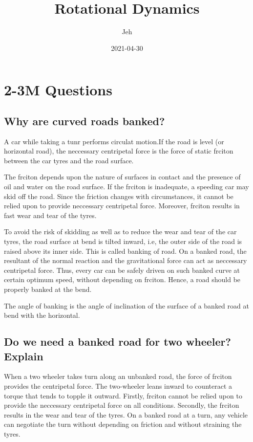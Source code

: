 \documentclass{article}
\title{Rotational Dynamics}
\date{2021-04-30}
\author{Jeh}
\begin{document}
\maketitle
{}
   \section{2-3M Questions}
   \subsection{Why are curved roads banked?}
   A car while taking a tunr performs circulat motion.If the 
   road is level (or horizontal road), the neccessary 
   centripetal force is the force of static frciton between the
   car tyres and the road surface.

   The frciton depends upon the nature of surfaces in contact
   and the presence of oil and water on the road surface. If 
   the frciton is inadequate, a speeding car may skid off the
   road. Since the friction changes with circumstances, it 
   cannot be relied upon to provide neccessary centripetal force.
   Moreover, frciton results in fast wear and tear of the tyres.

   To avoid the risk of skidding as well as to reduce the wear
   and tear of the car tyres, the road surface at bend is tilted
   inward, i.e, the outer side of the road is raised above its
   inner side. This is called banking of road. On a banked road,
   the resultant of the normal reaction and the gravitational 
   force can act as neccessary centripetal force. Thus, every
   car can be safely driven on such banked curve at certain
   optimum speed, without depending on frciton. Hence, a road 
   should be properly banked at the bend.

   The angle of banking is the angle of inclination of the
   surface of a banked road at bend with the horizontal.

   \subsection{Do we need a banked road for two wheeler?Explain}
   When a two wheeler takes turn along an unbanked road, the
   force of frciton provides the centripetal force. The 
   two-wheeler leans inward to counteract a torque that tends
   to topple it outward. Firstly, frciton cannot be relied upon 
   to provide the neccessary centripetal force on all conditions.
   Secondly, the frciton results in the wear and tear of the 
   tyres. On a banked road at a turn, any vehicle can negotiate
   the turn without depending on friction and without straining
   the tyres.
\end{document}
